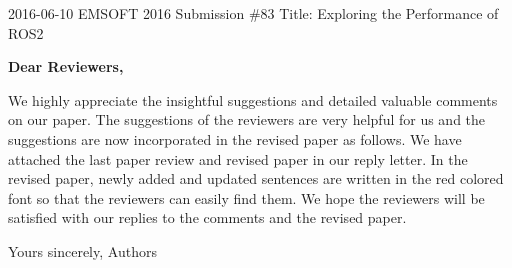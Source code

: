 \documentclass{article}
\begin{document}
\begin{flushleft}
  2016-06-10\newline
  EMSOFT 2016 Submission \#83\newline
  Title: Exploring the Performance of ROS2\newline
\end{flushleft}
\textbf{Dear Reviewers,}\newline

We highly appreciate the insightful suggestions and detailed valuable comments on our paper. The suggestions of the reviewers are very helpful for us and the suggestions are now incorporated in the revised paper as follows. We have attached the last paper review and revised paper in our reply letter. In the revised paper, newly added and updated sentences are written in the red colored font so that the reviewers can easily find them. We hope the reviewers will be satisfied with our replies to the comments and the revised paper.\newline\newline

\begin{flushleft}
  Yours sincerely,\newline
  Authors
\end{flushleft}

\clearpage




\end{document}
